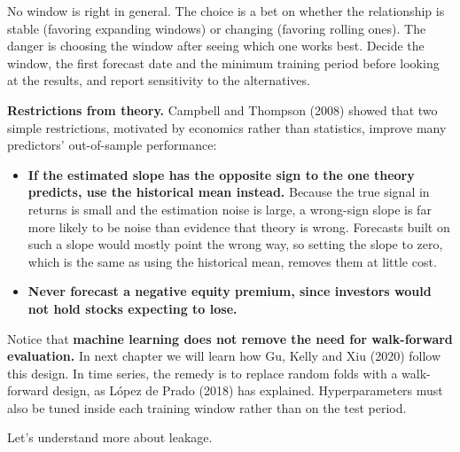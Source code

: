 
No window is right in general. The choice is a bet on whether the relationship is stable (favoring expanding windows) or changing (favoring rolling ones). The danger is choosing the window after seeing which one works best. Decide the window, the first forecast date and the minimum training period before looking at the results, and report sensitivity to the alternatives.

\textbf{Restrictions from theory.} Campbell and Thompson (2008) showed that two simple restrictions, motivated by economics rather than statistics, improve many predictors' out-of-sample performance:

\begin{itemize}
  \item \textbf{If the estimated slope has the opposite sign to the one theory predicts, use the historical mean instead.} Because the true signal in returns is small and the estimation noise is large, a wrong-sign slope is far more likely to be noise than evidence that theory is wrong. Forecasts built on such a slope would mostly point the wrong way, so setting the slope to zero, which is the same as using the historical mean, removes them at little cost.
  \item \textbf{Never forecast a negative equity premium, since investors would not hold stocks expecting to lose.} 
\end{itemize}

Notice that \textbf{machine learning does not remove the need for walk-forward evaluation.} In next chapter we will learn how Gu, Kelly and Xiu (2020) follow this design.
In time series, the remedy is to replace random folds with a walk-forward design, as L\'opez de Prado (2018) has explained. Hyperparameters must also be tuned inside each training window rather than on the test period. 

Let's understand more about leakage.

